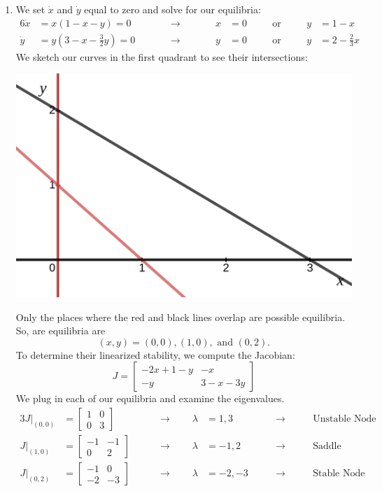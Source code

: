 \documentclass[10pt,letterpaper]{report}
\newcommand{\mtx}[2]{\left[\begin{array}{#1}#2\end{array}\right]}
\begin{document}
\begin{enumerate}
\begin{enumerate}
        \item We set $\dot x$ and $\dot y$ equal to zero and solve for our equilibria:
        \begin{alignat*}{6}
            \dot x &= x(1 - x - y) = 0 
            &\qquad& \rightarrow &\qquad& 
            x &= 0 &\quad& \textrm{or} &\quad& y &= 1 - x 
            \\
            \dot y &= y\left(3 - x - \frac{3}{2}y\right) = 0 
            &\qquad& \rightarrow &\qquad& 
            y &= 0 &\quad& \textrm{or} &\quad& y &= 2 - \frac{2}{3}x
        \end{alignat*}
        We sketch our curves in the first quadrant to see their intersections:
        \begin{center}
        \includegraphics[height=0.3\textwidth]{img/2019F1a.png}
        \end{center}
        Only the places where the red and black lines overlap are possible equilibria. So, are equilibria are
        \[
        (x, y) = (0, 0), (1, 0), \textrm{ and } (0, 2).
        \]
        To determine their linearized stability, we compute the Jacobian:
        \[
        J = \mtx{cc}{
        -2x + 1 - y & -x \\ 
        -y & 3 - x - 3y
        }
        \]
        We plug in each of our equilibria and examine the eigenvalues.
        \begin{alignat*}{3}
            J\big\vert_{(0, 0)} &= \mtx{cc}{1 & 0 \\ 0 & 3} \qquad &\rightarrow \qquad \lambda &= 1, 3 \qquad &\rightarrow& \qquad \textrm{Unstable Node}
            \\
            J\big\vert_{(1, 0)} &= \mtx{rr}{-1 & -1 \\ 0 & 2} \qquad &\rightarrow \qquad \lambda &= -1, 2 \qquad &\rightarrow& \qquad \textrm{Saddle (Unstable)}
            \\
            J\big\vert_{(0, 2)} &= \mtx{cc}{-1 & 0 \\ -2 & -3} \qquad &\rightarrow \qquad \lambda &= -2, -3 \qquad &\rightarrow& \qquad \textrm{Stable Node}
        \end{alignat*}
        

\end{enumerate}
\end{enumerate}
\end{document}
